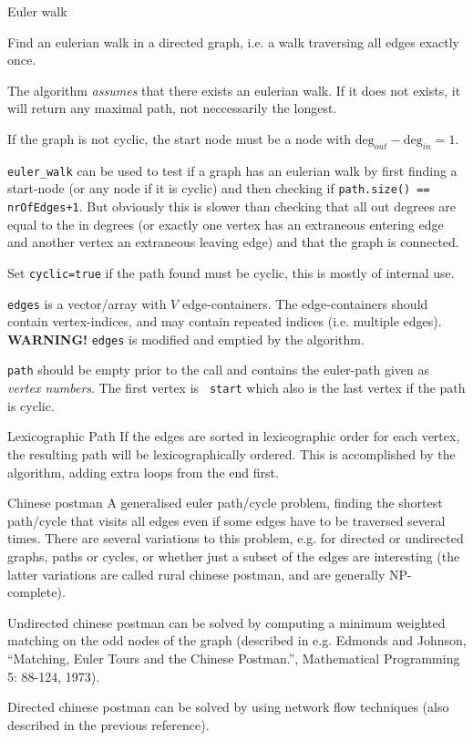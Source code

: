 
\begin{algorithm}{Euler walk}

\desc
Find an eulerian walk in a directed graph, i.e. a walk traversing all
edges exactly once.

The algorithm \emph{assumes} that there exists an eulerian walk. If it
does not exists, it will return any maximal path, not neccessarily the
longest.

If the graph is not cyclic, the start node must be a node with
$\mathrm{deg}_{out}-\mathrm{deg}_{in} = 1$.

{\tt euler\_walk} can be used to test if a graph has an eulerian walk
by first finding a start-node (or any node if it is cyclic) and then
checking if {\tt path.size() == nrOfEdges+1}. But obviously this is
slower than checking that all out degrees are equal to the in degrees
(or exactly one vertex has an extraneous entering edge and another
vertex an extraneous leaving edge) and that the graph is connected.

Set {\tt cyclic=true} if the path found must be cyclic, this is mostly
of internal use.

{\tt edges} is a vector/array with $V$ edge-containers. The
edge-containers should contain vertex-indices, and may contain
repeated indices (i.e. multiple edges). {\bf WARNING!} {\tt edges} is
modified and emptied by the algorithm.

{\tt path} should be empty prior to the call and contains the
euler-path given as \emph{vertex numbers}. The first vertex is {\tt
start} which also is the last vertex if the path is cyclic.

\item[Lexicographic Path] If the edges are sorted in lexicographic order for
each vertex, the resulting path will be lexicographically
ordered. This is accomplished by the algorithm, adding extra loops
from the end first.
\end{algorithm}

\begin{algorithm}{Chinese postman}
\desc
A generalised euler path/cycle problem, finding the shortest
path/cycle that visits all edges even if some edges have to be
traversed several times.  There are several variations to this
problem, e.g. for directed or undirected graphs, paths or cycles, or
whether just a subset of the edges are interesting (the latter
variations are called rural chinese postman, and are generally
NP-complete).

Undirected chinese postman can be solved by computing a minimum
weighted matching on the odd nodes of the graph (described in
e.g. Edmonds and Johnson, ``Matching, Euler Tours and the Chinese
Postman.'', Mathematical Programming 5: 88-124, 1973).

Directed chinese postman can be solved by using network flow
techniques (also described in the previous reference).
\end{algorithm}

